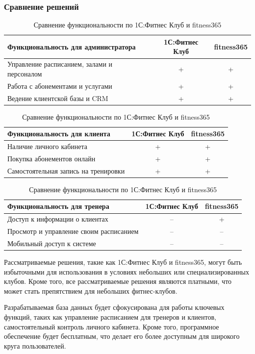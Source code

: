 \subsubsection*{Сравнение решений}

\begin{table}[ht]
	\centering
	\begin{tabular}{|p{9cm}|c|c|}
		\hline
		\textbf{Функциональность для администратора} & \textbf{1С:Фитнес Клуб} & \textbf{fitness365} \\ \hline
		Управление расписанием, залами и персоналом & + & + \\ \hline
		Работа с абонементами и услугами & + & + \\ \hline
		Ведение клиентской базы и CRM & + & + \\ \hline
	\end{tabular}
	\begin{tabular}{|p{9cm}|c|c|}
		\hline
		\textbf{Функциональность для клиента} & \textbf{1С:Фитнес Клуб} & \textbf{fitness365} \\ \hline
		Наличие личного кабинета & + & + \\ \hline
		Покупка абонементов онлайн & + & + \\ \hline
		Самостоятельная запись на тренировки & + & + \\ \hline
	\end{tabular}
	\begin{tabular}{|p{9cm}|c|c|}
		\hline
		\textbf{Функциональность для тренера} & \textbf{1С:Фитнес Клуб} & \textbf{fitness365} \\ \hline
		Доступ к информации о клиентах & -- & + \\ \hline
		Просмотр и управление своим расписанием & -- & -- \\ \hline
		Мобильный доступ к системе & -- & -- \\ \hline
	\end{tabular}
	\caption{Сравнение функциональности по 1С:Фитнес Клуб и fitness365}
\end{table}

Рассматриваемые решения, такие как 1С:Фитнес Клуб и fitness365, могут быть избыточными для использования в условиях небольших или специализированных клубов. Кроме того, все рассматриваемые решения являются платными, что может стать препятствием для небольших фитнес-клубов. 

Разрабатываемая база данных будет сфокусирована для работы ключевых функций, таких как управление расписанием для тренеров и клиентов, самостоятельный контроль личного кабинета. Кроме того, программное обеспечение будет бесплатным, что делает его более доступным для широкого круга пользователей. 

